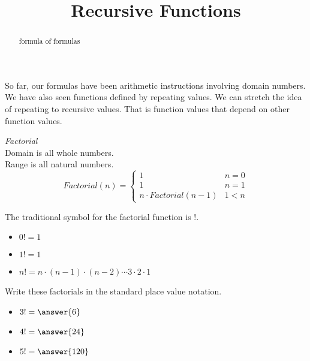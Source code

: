 \documentclass{ximera}
\title{Recursive Functions}
\begin{document}
\begin{abstract}
formula of formulas
\end{abstract}
\maketitle



So far, our formulas have been arithmetic instructions involving domain numbers. We have also seen functions defined by repeating values. We can stretch the idea of repeating to recursive values.  That is function values that depend on other function values.









\begin{example}  \textit{Factorial} \\



Domain is all whole numbers. \\
Range is all natural numbers. \\




\[
Factorial(n) = 
\begin{cases}
  1 & n = 0 \\
  1 & n = 1 \\ 
  n \cdot Factorial(n-1) & 1 < n
\end{cases}
\]

The traditional symbol for the factorial function is !.


\begin{itemize}
  \item $0! = 1$
  \item $1! = 1$
  \item $n! = n \cdot (n-1) \cdot (n-2) \cdots 3 \cdot 2 \cdot 1$
\end{itemize}





\begin{question} Write these factorials in the standard place value notation.


\begin{itemize}
\item $3! = \answer{6}$
\item $4! = \answer{24}$
\item $5! = \answer{120}$
\end{itemize}


\end{question}



\end{example}
\end{document}
